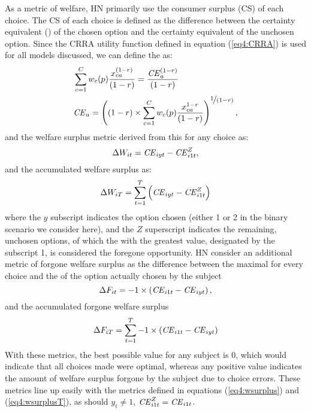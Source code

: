 \documentclass[../main.tex]{subfiles}
\begin{document}
As a metric of welfare, HN primarily use the consumer surplus (CS) of each choice.
The CS of each choice is defined as the difference between the certainty equivalent ({\CE}) of the chosen option and the certainty equivalent of the unchosen option.
Since the CRRA utility function defined in equation (\ref{eq4:CRRA}) is used for all models discussed, we can define the {\CE} as:
\begin{align}
	\label{eq4:CEcalc}
	\begin{split}
		&\sum_{c=1}^{C} w_c(p) \frac{x_{ca}^{(1-r)}}{(1-r)} = \frac{ {\mathit{CE}}_a^{(1-r)}}{(1-r)}\\
		&{\mathit{CE}}_a =  \left( (1-r) \times \sum_{c=1}^{C} w_c(p) \frac{x_{ca}^{1-r}}{(1-r)} \right)^{ \displaystyle\nicefrac{1}{(1-r)} } ,
	\end{split}
\end{align}
\noindent and the welfare surplus metric derived from this {\CE} for any choice as:
\begin{equation}
	\label{eq4:wsurplus}
	\Delta W_{it} =  {\mathit{CE}}_{iyt} - {\mathit{CE}}_{i1t}^Z ,
\end{equation}
\noindent and the accumulated welfare surplus as:
\begin{equation}
	\label{eq4:wsurplusT}
	\Delta W_{iT} = \sum_{t=1}^T \left( {\mathit{CE}}_{iyt} - {\mathit{CE}}_{i1t}^Z \right)
\end{equation}
\noindent where the $y$ subscript indicates the option chosen (either 1 or 2 in the binary scenario we consider here), and the $Z$ superscript indicates the remaining, unchosen options, of which the {\CE} with the greatest value, designated by the subscript 1, is considered the foregone opportunity.
HN \parencite*[106]{Harrison2016} consider an additional metric of forgone welfare surplus as the difference between the maximal {\CE} for every choice and the {\CE} of the option actually chosen by the subject
\begin{equation}
	\label{eq4:wforgone}
	\Delta F_{it} = -1 \times \left( {\mathit{CE}}_{i1t} - {\mathit{CE}}_{iyt} \right) , 
\end{equation}
\noindent and the accumulated forgone welfare surplus
\begin{equation}
	\label{eq4:wforgoneT}
	\Delta F_{iT} = \sum_{t=1}^T  -1 \times \left( {\mathit{CE}}_{i1t} - {\mathit{CE}}_{iyt} \right)
\end{equation}
\noindent With these metrics, the best possible value for any subject is 0, which would indicate that all choices made were optimal, whereas any positive value indicates the amount of welfare surplus forgone by the subject due to choice errors.
These metrics line up easily with the metrics defined in equations (\ref{eq4:wsurplus}) and (\ref{eq4:wsurplusT}), as should $y_t \neq 1$, ${\mathit{CE}}_{i1t}^Z = {\mathit{CE}}_{i1t}$.
\end{document}

